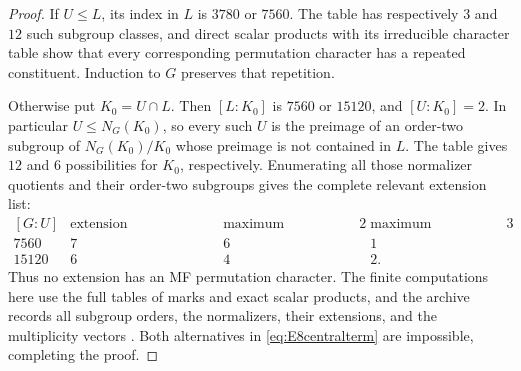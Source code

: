 \documentclass[11pt]{article}
\numberwithin{equation}{section}
\theoremstyle{definition}
\begin{document}
\begin{proof}
If \(U\leq L\), its index in \(L\) is \(3780\) or \(7560\).
The table has respectively \(3\) and \(12\) such subgroup classes, and direct scalar products with its irreducible character table show that every corresponding permutation character has a repeated constituent.
Induction to \(G\) preserves that repetition.

Otherwise put \(K_0=U\cap L\).
Then \([L:K_0]\) is \(7560\) or \(15120\), and \([U:K_0]=2\).
In particular \(U\leq N_G(K_0)\), so every such \(U\) is the preimage of an order-two subgroup of \(N_G(K_0)/K_0\) whose preimage is not contained in \(L\).
The table gives \(12\) and \(6\) possibilities for \(K_0\), respectively.
Enumerating all those normalizer quotients and their order-two subgroups gives the complete relevant extension list:
\[
\begin{array}{c|r|r|r}
 [G:U]&\text{extension representatives}&
  \text{maximum multiplicity }2&\text{maximum multiplicity }3\\ \hline
 7560&7&6&1\\
 15120&6&4&2.
\end{array}
\]
Thus no extension has an MF permutation character.
The finite computations here use the full tables of marks and exact scalar products, and the archive records all subgroup orders, the normalizers, their extensions, and the multiplicity vectors \cite{GAP,CTblLib,TomLib,ZhangData}.
Both alternatives in \eqref{eq:E8centralterm} are impossible, completing the proof.
\end{proof}
\end{document}
